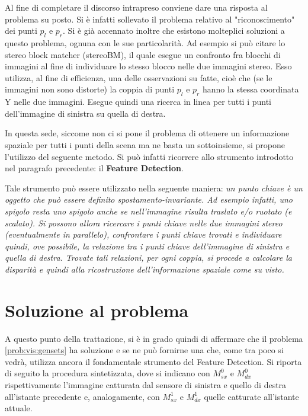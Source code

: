 Al fine di completare il discorso intrapreso conviene dare una risposta al problema su posto. Si è infatti sollevato il problema relativo al "riconoscimento" dei punti $p_l$ e $p_r$. Si è già accennato inoltre che esistono molteplici soluzioni a questo problema, ognuna con le sue particolarità. Ad esempio si può citare lo stereo block matcher (stereoBM), il quale esegue un confronto fra blocchi di immagini al fine di individuare lo stesso blocco nelle due immagini stereo. Esso utilizza, al fine di efficienza, una delle osservazioni su fatte, cioè che (se le immagini non sono distorte) la coppia di punti $p_l$ e $p_r$ hanno la stessa coordinata Y nelle due immagini. Esegue quindi una ricerca in linea per tutti i punti dell'immagine di sinistra su quella di destra.

In questa sede, siccome non ci si pone il problema di ottenere un informazione spaziale per tutti i punti della scena ma ne basta un sottoinsieme, si propone l'utilizzo del seguente metodo. Si può infatti ricorrere allo strumento introdotto nel paragrafo precedente: il \textbf{Feature Detection}. 

Tale strumento può essere utilizzato nella seguente maniera: \textit{un punto chiave è un oggetto che può essere definito spostamento-invariante. Ad esempio infatti, uno spigolo resta uno spigolo anche se nell'immagine risulta traslato e/o ruotato (e scalato). Si possono allora ricercare i punti chiave nelle due immagini stereo (eventualmente in parallelo), confrontare i punti chiave trovati e individuare quindi, ove possibile, la relazione tra i punti chiave dell'immagine di sinistra e quella di destra. Trovate tali relazioni, per ogni coppia, si procede a calcolare la disparità e quindi alla ricostruzione dell'informazione spaziale come su visto.}


\section{Soluzione al problema}
\label{sec:vision:solution}
A questo punto della trattazione, si è in grado quindi di affermare che il problema \ref{prob:vis:gensets} ha soluzione e se ne può fornirne una che, come tra poco si vedrà, utilizza ancora il fondamentale strumento del Feature Detection. Si riporta di seguito la procedura sintetizzata, dove si indicano con $M_{sx}^0$ e $M_{dx}^0$ rispettivamente l'immagine catturata dal sensore di sinistra e quello di destra all'istante precedente e, analogamente, con $M_{sx}^1$ e $M_{dx}^1$ quelle catturate all'istante attuale.

